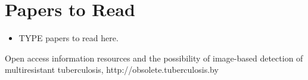 \documentclass[letterpaper, 12pt]{article}
\begin{document}
\section{Papers to Read}
\begin{itemize}
\item
TYPE papers to read here.
\end{itemize}


\begin{thebibliography}{1}
Open access information resources and the possibility of image-based detection of multiresistant tuberculosis, http://obsolete.tuberculosis.by
\end{thebibliography}
\end{document}
